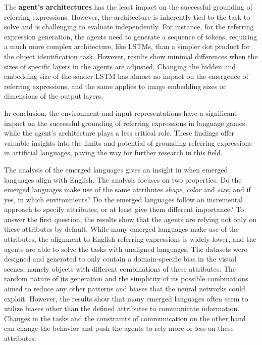 The \textbf{agent's architectures} has the least impact on the successful grounding of referring expressions.
However, the architecture is inherently tied to the task to solve and is challenging to evaluate independently.
For instance, for the referring expression generation, the agents need to generate a sequence of tokens, requiring a much more complex architecture, like LSTMs, than a simpler dot product for the object identification task.
However, results show minimal differences when the sizes of specific layers in the agents are adjusted.
Changing the hidden and embedding size of the sender LSTM has almost no impact on the emergence of referring expressions, and the same applies to image embedding sizes or dimensions of the output layers.

In conclusion, the environment and input representations have a significant impact on the successful grounding of referring expressions in language games, while the agent's architecture plays a less critical role.
These findings offer valuable insights into the limits and potential of grounding referring expressions in artificial languages, paving the way for further research in this field.

The analysis of the emerged languages gives an insight in when emerged languages align with English.
The analysis focuses on two properties.
Do the emerged languages make use of the same attributes \emph{shape}, \emph{color} and \emph{size}, and if yes, in which environments?
Do the emerged languages follow an incremental approach to specify attributes, or at least give them different importance?
To answer the first question, the results show that the agents are relying not only on these attributes by default.
While many emerged languages make use of the attributes, the alignment to English referring expressions is widely lower, and the agents are able to solve the tasks with unaligned languages.
The datasets were designed and generated to only contain a domain-specific bias in the visual scenes, namely objects with different combinations of these attributes.
The random nature of its generation and the simplicity of its possible combinations aimed to reduce any other patterns and biases that the neural networks could exploit.
However, the results show that many emerged languages often seem to utilize biases other than the defined attributes to communicate information.
Changes in the tasks and the constraints of communication on the other hand can change the behavior and push the agents to rely more or less on these attributes.

